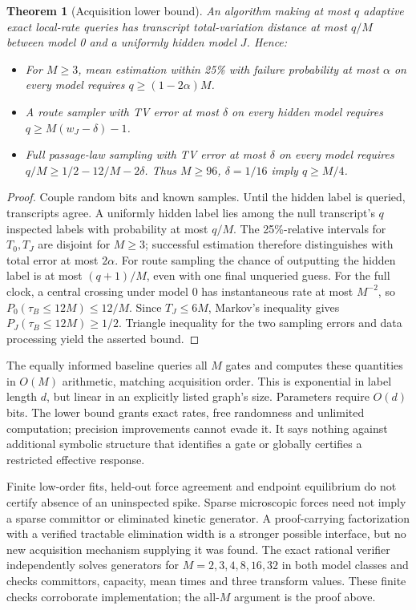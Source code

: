 \documentclass[11pt]{article}
\newtheorem{theorem}{Theorem}
\begin{document}
\begin{theorem}[Acquisition lower bound]\label{thm:query}
An algorithm making at most $q$ adaptive exact local-rate queries has
transcript total-variation distance at most $q/M$ between model 0 and a
uniformly hidden model $J$. Hence:
\begin{itemize}
\item For $M\ge3$, mean estimation within 25\% with failure probability at
most $\alpha$ on every model requires $q\ge(1-2\alpha)M$.
\item A route sampler with TV error at most $\delta$ on every hidden model
requires $q\ge M(w_J-\delta)-1$.
\item Full passage-law sampling with TV error at most $\delta$ on every model
requires $q/M\ge1/2-12/M-2\delta$. Thus $M\ge96$, $\delta=1/16$ imply
$q\ge M/4$.
\end{itemize}
\end{theorem}
\begin{proof}
Couple random bits and known samples. Until the hidden label is queried,
transcripts agree. A uniformly hidden label lies among the null transcript's
$q$ inspected labels with probability at most $q/M$.
The 25\%-relative intervals for $T_0,T_J$ are disjoint for $M\ge3$;
successful estimation therefore distinguishes with total error at most
$2\alpha$. For route sampling the chance of outputting the hidden label is
at most $(q+1)/M$, even with one final unqueried guess.
For the full clock, a central crossing under model 0 has instantaneous rate
at most $M^{-2}$, so $P_0(\tau_B\le12M)\le12/M$.
Since $T_J\le6M$, Markov's inequality gives
$P_J(\tau_B\le12M)\ge1/2$. Triangle inequality for the two sampling errors
and data processing yield the asserted bound.
\end{proof}

The equally informed baseline queries all $M$ gates and computes these
quantities in $O(M)$ arithmetic, matching acquisition order. This is exponential
in label length $d$, but linear in an explicitly listed graph's size.
Parameters require $O(d)$ bits. The lower bound grants exact rates, free
randomness and unlimited computation; precision improvements cannot evade it.
It says nothing against additional symbolic structure that identifies a gate
or globally certifies a restricted effective response.

Finite low-order fits, held-out force agreement and endpoint equilibrium do
not certify absence of an uninspected spike. Sparse microscopic forces need
not imply a sparse committor or eliminated kinetic generator. A proof-carrying
factorization with a verified tractable elimination width is a stronger possible
interface, but no new acquisition mechanism supplying it was found.
The exact rational verifier independently solves generators for
$M=2,3,4,8,16,32$ in both model classes and checks committors, capacity,
mean times and three transform values. These finite checks corroborate
implementation; the all-$M$ argument is the proof above.
\end{document}
